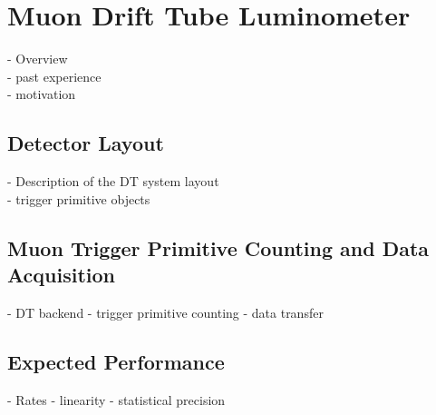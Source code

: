 \chapter{Muon Drift Tube Luminometer}

- Overview \\
- past experience \\
- motivation

\section{Detector Layout}
- Description of the DT system layout \\
- trigger primitive objects

\section{Muon Trigger Primitive Counting and Data Acquisition}
- DT backend
- trigger primitive counting
- data transfer

\section{Expected Performance}
- Rates
- linearity
- statistical precision

\clearpage

